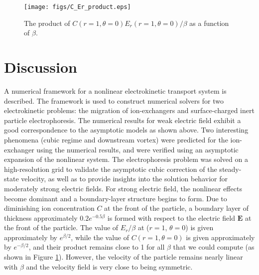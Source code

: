 \documentclass[preprint,10pt]{elsarticle}
\newcommand\bE{\boldsymbol{E}}
\begin{document}
\begin{figure}
    \begin{center}
    \texttt{[image: figs/C\_Er\_product.eps]}
        \caption{The product of $C(r=1, \theta=0) E_r(r=1, \theta=0) / \beta$ as
        a function of $\beta$.}
	    \label{fig:C_Er_product}	    
    \end{center}
\end{figure}


\section{Discussion} \label{sec:discussion}
A numerical framework for a
nonlinear electrokinetic transport system is described.
The framework is used to construct numerical solvers 
for two electrokinetic problems: the migration of ion-exchangers
and surface-charged inert particle electrophoresis.
The numerical results for weak electric field 
exhibit a good correspondence to the asymptotic models as shown above.
Two interesting phenomena (cubic regime and downstream vortex) were predicted for the ion-exchanger
using the numerical results, and were verified using an asymptotic expansion of the nonlinear system.
The electrophoresis problem was solved on a high-resolution grid to validate the asymptotic 
cubic correction of the steady-state velocity, as well as to provide insights into
the solution behavior for moderately strong electric fields.
For strong electric field, the nonlinear effects become dominant and
a boundary-layer structure begins to form.
Due to diminishing ion concentration $C$ at the front of the particle,
a boundary layer of thickness approximately $0.2 e^{-0.5\beta}$ 
is formed with respect to the electric field $\bE$ at the front of the particle.
The value of $E_r / \beta$ at ($r = 1$, $\theta = 0$) is given approximately by 
$e^{\beta/2}$, while the value of $C(r = 1, \theta = 0)$ is given approximately 
by $e^{-\beta/2}$, and their product remains close to 1 for all $\beta$ that we could compute
(as shown in Figure \ref{fig:C_Er_product}).
However, the velocity of the particle remains nearly linear with $\beta$
and the velocity field is very close to being symmetric.
\end{document}
